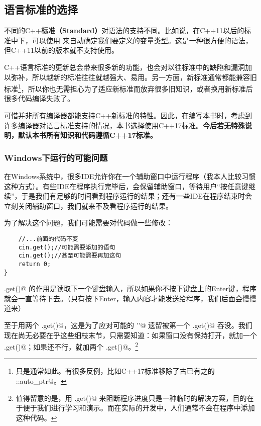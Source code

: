 \subsection*{语言标准的选择}
不同的C++\textbf{标准（Standard）}对语法的支持不同。比如说，在C++11以后的标准中下，可以使用 \lstinline@auto@ 来自动确定我们要定义的变量类型。这是一种很方便的语法，但C++11以前的版本就不支持使用。\par
C++语言标准的更新总会带来很多新的功能，也会对以往标准中的缺陷和漏洞加以弥补，所以越新的标准往往就越强大、易用。另一方面，新标准通常都能兼容旧标准\footnote{只是通常如此。有很多反例，比如C++17标准移除了古已有之的 \lstinline@std::auto_ptr@。}，所以你也无需担心为了适应新标准而放弃很多旧知识，或者换用新标准后很多代码编译失败了。\par
可惜并非所有编译器都能支持C++新标准的特性。因此，在编写本书时，考虑到许多编译器对语言标准支持的情况，本书选择使用C++17标准。\textbf{今后若无特殊说明，默认本书所有知识和代码遵循C++17标准。}\par
\subsubsection*{Windows下运行的可能问题}
在Windows系统中，很多IDE允许你在一个辅助窗口中运行程序（我本人比较习惯这种方式）。有些IDE在程序执行完毕后，会保留辅助窗口，等待用户``按任意键继续''，于是我们有足够的时间看到程序运行的结果；还有一些IDE在程序结束时会立刻关闭辅助窗口，我们就来不及看程序运行的结果。\par
为了解决这个问题，我们可能需要对代码做一些修改：
\begin{lstlisting}
    //...前面的代码不变
    cin.get();//可能需要添加的语句
    cin.get();//甚至可能需要再加这句
    return 0;
}
\end{lstlisting}
\lstinline@cin.get()@ 的作用是读取下一个键盘输入，所以如果你不按下键盘上的Enter键，程序就会一直等待下去。（只有按下Enter，输入内容才能发送给程序，我们后面会慢慢道来）\par
至于用两个 \lstinline@cin.get()@，这是为了应对可能的 \lstinline@'\n'@ 遗留被第一个 \lstinline@cin.get()@ 吞没。我们现在尚无必要在乎这些细枝末节，只需要知道：如果窗口没有保持打开，就加一个 \lstinline@cin.get()@；如果还不行，就加两个 \lstinline@cin.get()@。\footnote{值得留意的是，用 \lstinline@cin.get()@ 来阻断程序进度只是一种临时的解决方案，目的在于便于我们进行学习和演示。而在实际的开发中，人们通常不会在程序中添加这种代码。}\par
